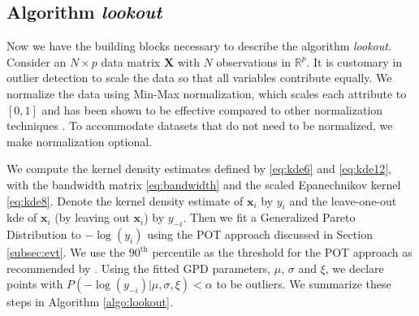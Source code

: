 \documentclass[12pt]{article}
\theoremstyle{definition}
\theoremstyle{definition}
\theoremstyle{definition}
\theoremstyle{definition}
\theoremstyle{remark}
\begin{document}
\hypertarget{algorithm-lookout}{%
\subsection{\texorpdfstring{Algorithm \emph{lookout}}{Algorithm lookout}}\label{algorithm-lookout}}

Now we have the building blocks necessary to describe the algorithm \emph{lookout}. Consider an \(N \times p\) data matrix \(\bm{X}\) with \(N\) observations in \(\mathbb{R}^p\). It is customary in outlier detection to scale the data so that all variables contribute equally. We normalize the data using Min-Max normalization, which scales each attribute to \([0, 1]\) and has been shown to be effective compared to other normalization techniques \citep{normalizationoutliers}. To accommodate datasets that do not need to be normalized, we make normalization optional.

We compute the kernel density estimates defined by \eqref{eq:kde6} and \eqref{eq:kde12}, with the bandwidth matrix \eqref{eq:bandwidth} and the scaled Epanechnikov kernel \eqref{eq:kde8}. Denote the kernel density estimate of \(\bm{x}_i\) by \(y_i\) and the leave-one-out kde of \(\bm{x}_i\) (by leaving out \(\bm{x}_i\)) by \(y_{-i}\). Then we fit a Generalized Pareto Distribution to \(-\log(y_i)\) using the POT approach discussed in Section \ref{subsec:evt}. We use the \(90^{\text{th}}\) percentile as the threshold for the POT approach as recommended by \citet{bommier2014peaks}. Using the fitted GPD parameters, \(\mu\), \(\sigma\) and \(\xi\), we declare points with \(P\left(-\log(y_{-i})|\mu, \sigma,\xi \right) < \alpha\) to be outliers. We summarize these steps in Algorithm \ref{algo:lookout}.
\end{document}
